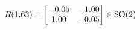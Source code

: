 \documentclass[preview]{standalone}
\begin{document}
\begin{align*}
\special{dvisvgm:raw <g id='unique000'>}R(1.63) = \begin{bmatrix} -0.05 & -1.00 \\ 1.00 & -0.05 \end{bmatrix} \in \text{SO}(2)\special{dvisvgm:raw </g>}
\end{align*}
\end{document}
